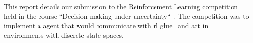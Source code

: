 This report details our submission to the Reinforcement Learning competition held in the course ``Decision making under uncertainty``~\cite{decmaking}. The competition was to implement a agent that would communicate with rl glue~\cite{rl-glue} and act in environments with discrete state spaces.
